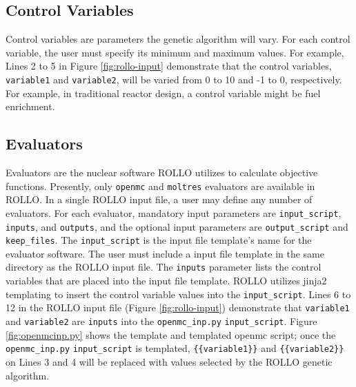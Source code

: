 \subsection{Control Variables}
Control variables are parameters the genetic algorithm will vary. 
For each control variable, the user must specify its minimum and maximum values.
For example, Lines 2 to 5 in Figure \ref{fig:rollo-input} demonstrate that the 
control variables, \texttt{variable1} and \texttt{variable2}, 
will be varied from 0 to 10 and -1 to 0, respectively. 
For example, in traditional reactor design, a control variable might be fuel 
enrichment. 

\subsection{Evaluators}
Evaluators are the nuclear software \gls{ROLLO} utilizes to calculate objective functions. 
Presently, only \texttt{openmc} and \texttt{moltres} evaluators are available 
in \gls{ROLLO}.
In a single \gls{ROLLO} input file, a user may define any number of evaluators. 
For each evaluator, mandatory input parameters are \texttt{input\_script}, 
\texttt{inputs}, and \texttt{outputs}, and the optional input parameters are
\texttt{output\_script} and \texttt{keep\_files}. 
The \texttt{input\_script} is the input file template's name for the evaluator software. 
The user must include a input file template in the same directory as the \gls{ROLLO} input 
file. 
The \texttt{inputs} parameter lists the control variables that are placed into the 
input file template. 
\gls{ROLLO} utilizes jinja2 templating \cite{ronacher_welcome_2018} to insert 
the control variable values into the \texttt{input\_script}. 
Lines 6 to 12 in the \gls{ROLLO} input file (Figure \ref{fig:rollo-input}) demonstrate 
that \texttt{variable1} and \texttt{variable2} are \texttt{inputs} into the 
\texttt{openmc\_inp.py} \texttt{input\_script}. 
Figure \ref{fig:openmcinp.py} shows the template and templated openmc script; 
once the \texttt{openmc\_inp.py} \texttt{input\_script} is templated, 
\texttt{\{\{variable1\}\}} and \texttt{\{\{variable2\}\}}  on Lines 3 and 4 will be 
replaced with values selected by the \gls{ROLLO} genetic algorithm. 
